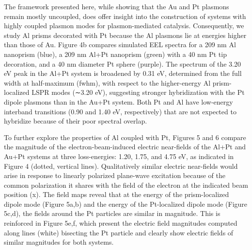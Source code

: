 \documentclass [11pt, proquest] {uwthesis}[2016/11/22]
\begin{document}
The framework presented here, while showing that the Au and Pt plasmons remain mostly uncoupled, does offer insight into the construction of systems with highly coupled plasmon modes for plasmon-mediated catalysis. Consequently, we study Al prisms\cite{Aluminum,AluminumHydrogen} decorated with Pt because the Al plasmons lie at energies higher than those of Au\cite{NordHalAluminum}. Figure 4b compares simulated EEL spectra for a 209 nm Al nanoprism (blue), a 209 nm Al+Pt nanoprism (green) with a 40 nm Pt tip decoration, and a 40 nm diameter Pt sphere (purple). The spectrum of the 3.20 eV peak in the Al+Pt system is broadened by 0.31 eV, determined from the full width at half-maximum (fwhm), with respect to the higher-energy Al prism-localized LSPR modes (∼3.20 eV), suggesting stronger hybridization with the Pt dipole plasmons than in the Au+Pt system. Both Pt and Al have low-energy interband transitions (0.90 and 1.40 eV, respectively) that are not expected to hybridize because of their poor spectral overlap\cite{Segall}.

To further explore the properties of Al coupled with Pt, Figures 5 and 6 compare the magnitude of the electron-beam-induced electric near-fields of the Al+Pt and Au+Pt systems at three loss-energies: 1.20, 1.75, and 4.75 eV, as indicated in Figure 4 (dotted, vertical lines). Qualitatively similar electric near-fields would arise in response to linearly polarized plane-wave excitation because of the common polarization it shares with the field of the electron at the indicated beam position (x). The field maps reveal that at the energy of the prism-localized dipole mode (Figure 5a,b) and the energy of the Pt-localized dipole mode (Figure 5c,d), the fields around the Pt particles are similar in magnitude. This is reinforced in Figure 5e,f, which present the electric field magnitudes computed along lines (white) bisecting the Pt particle and clearly show electric fields of similar magnitudes for both systems.
\end{document}
